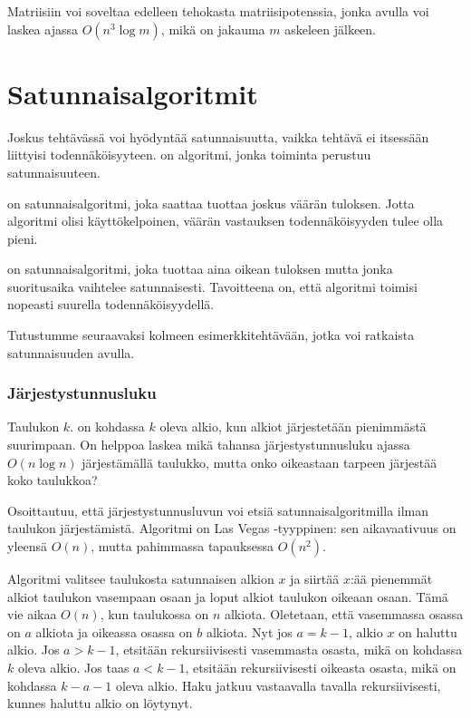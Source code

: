 Matriisiin voi soveltaa edelleen tehokasta
matriisipotenssia, jonka avulla voi laskea
ajassa $O(n^3 \log m)$,
mikä on jakauma $m$ askeleen jälkeen.

\section{Satunnaisalgoritmit}


Joskus tehtävässä voi hyödyntää satunnaisuutta,
vaikka tehtävä ei itsessään liittyisi todennäköisyyteen.
 on algoritmi, jonka toiminta
perustuu satunnaisuuteen.


 on satunnaisalgoritmi,
joka saattaa tuottaa joskus väärän tuloksen.
Jotta algoritmi olisi käyttökelpoinen,
väärän vastauksen todennäköisyyden tulee olla pieni.


 on satunnaisalgoritmi,
joka tuottaa aina oikean tuloksen mutta jonka
suoritusaika vaihtelee satunnaisesti.
Tavoitteena on, että algoritmi toimisi nopeasti
suurella todennäköisyydellä.

Tutustumme seuraavaksi kolmeen esimerkkitehtävään,
jotka voi ratkaista satunnaisuuden avulla.

\subsubsection{Järjestystunnusluku}


Taulukon $k$. 
on kohdassa $k$ oleva alkio,
kun alkiot järjestetään
pienimmästä suurimpaan.
On helppoa laskea mikä tahansa
järjestystunnusluku ajassa $O(n \log n)$
järjestämällä taulukko,
mutta onko oikeastaan tarpeen järjestää koko taulukkoa?

Osoittautuu, että järjestystunnusluvun
voi etsiä satunnaisalgoritmilla ilman taulukon
järjestämistä.
Algoritmi on Las Vegas -tyyppinen:
sen aikavaativuus on yleensä $O(n)$,
mutta pahimmassa tapauksessa $O(n^2)$.

Algoritmi valitsee taulukosta satunnaisen alkion $x$
ja siirtää $x$:ää pienemmät alkiot
taulukon vasempaan osaan ja loput alkiot
taulukon oikeaan osaan.
Tämä vie aikaa $O(n)$, kun taulukossa on $n$ alkiota.
Oletetaan, että vasemmassa osassa on $a$
alkiota ja oikeassa osassa on $b$ alkiota.
Nyt jos $a=k-1$, alkio $x$ on haluttu alkio.
Jos $a>k-1$, etsitään rekursiivisesti
vasemmasta osasta, mikä on kohdassa $k$ oleva alkio.
Jos taas $a<k-1$, etsitään rekursiivisesti
oikeasta osasta, mikä on kohdassa $k-a-1$ oleva alkio.
Haku jatkuu vastaavalla tavalla rekursiivisesti,
kunnes haluttu alkio on löytynyt.

